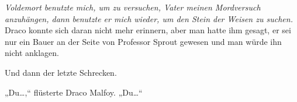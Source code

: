 \emph{Voldemort benutzte mich, um zu versuchen, Vater meinen Mordversuch anzuhängen, dann benutzte er mich wieder, um den Stein der Weisen zu suchen.}
Draco konnte sich daran nicht mehr erinnern, aber man hatte ihm gesagt, er sei nur ein Bauer an der Seite von Professor Sprout gewesen und man würde ihn nicht anklagen.

Und dann der letzte Schrecken.

„Du…,“ flüsterte Draco Malfoy. „Du…“

